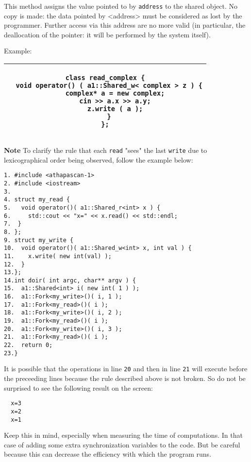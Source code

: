  This method assigns the value pointed to by {\verb+address+} to the shared object. No copy is made: 
 the data pointed by <address> must be considered as lost by the programmer. Further access via 
 this address are no more valid (in particular, the deallocation of the pointer: it will be performed by the system itself). 
 
Example:\\
\begin{center}
\begin{tabular}{|c|}
\hline
\rule{0mm}{4mm}%
\begin{minipage}[t]{124mm}
\begin{verbatim}
class read_complex {
  void operator() ( a1::Shared_w< complex > z ) {
     complex* a = new complex;
     cin >> a.x >> a.y;
     z.write ( a );
  }
};
\end{verbatim}
\end{minipage} \\
\hline
\end{tabular}
\end{center}

\noindent \textbf{Note}
\noindent  To clarify the rule that each \texttt{read} "sees" the last \texttt{write} 
due to lexicographical order being observed, follow the example below:

\begin{boxit}
%
\begin{verbatim}
1. #include <athapascan-1>
2. #include <iostream>
3.
4. struct my_read {
5.   void operator()( a1::Shared_r<int> x ) {
6.     std::cout << "x=" << x.read() << std::endl;
7.  }
8. };
9. struct my_write {
10.  void operator()( a1::Shared_w<int> x, int val ) {
11.    x.write( new int(val) );
12.  }
13.};
14.int doir( int argc, char** argv ) {
15.  a1::Shared<int> i( new int( 1 ) );
16.  a1::Fork<my_write>()( i, 1 ); 
17.  a1::Fork<my_read>()( i );
18.  a1::Fork<my_write>()( i, 2 );
19.  a1::Fork<my_read>()( i );  
20.  a1::Fork<my_write>()( i, 3 );
21.  a1::Fork<my_read>()( i ); 
22.  return 0;
23.}
\end{verbatim}
\end{boxit}
It is possible that the operations in line \texttt{20} and then in line \texttt{21} will 
execute before the preceeding lines because the rule described above is not 
broken. So do not be surprised to see the following result on the screen: 
\begin{verbatim}
  x=3
  x=2
  x=1
\end{verbatim}
Keep this in mind, especially when measuring the time of computations.  
In that case of adding some extra synchronization variables to the code.  But be
careful because this can decrease the efficiency with which the program runs.

